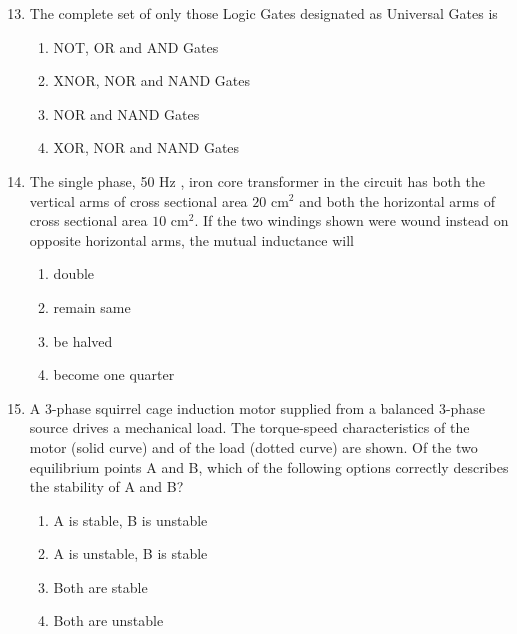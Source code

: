\documentclass[journal,9pt,onecolumn]{IEEEtran}
\begin{document}
\begin{enumerate}

\setcounter{enumi}{12}
\item The complete set of only those Logic Gates designated as Universal Gates is
\begin{multicols}{2}
\begin{enumerate}
     \item NOT, OR and AND Gates
    \item XNOR, NOR and NAND Gates
    \item NOR and NAND Gates
    \item XOR, NOR and NAND Gates
\end{enumerate}
\end{multicols}

\item The single phase, 50 Hz , iron core transformer in the circuit has both the vertical arms of cross sectional area $20$ cm$^{2}$ and both the horizontal arms of cross sectional area $10$ cm$^{2}$. If the two windings shown were wound instead on opposite horizontal arms, the mutual inductance will
\begin{center}
    
\end{center}
\begin{multicols}{4}
\begin{enumerate}
     \item double
    \item remain same
    \item be halved
    \item become one quarter
\end{enumerate}
\end{multicols}


\item A 3-phase squirrel cage induction motor supplied from a balanced 3-phase source drives a mechanical load. The torque-speed characteristics of the motor (solid curve) and of the load (dotted curve) are shown. Of the two equilibrium points A and B, which of the following options correctly describes the stability of A and B?
\begin{center}
    
\end{center}
\begin{multicols}{2}
    \begin{enumerate}
    \item A is stable, B is unstable
    \item A is unstable, B is stable
    \item Both are stable
    \item Both are unstable
    \end{enumerate}
\end{multicols}



\end{enumerate}
\end{document}
